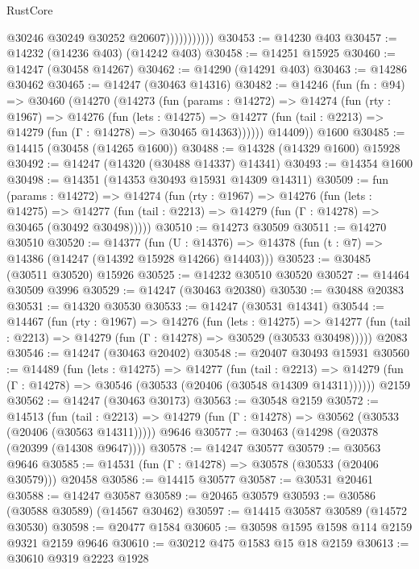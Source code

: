 \begin{lexlean}{RustCore}
\begin{coremodule}
                          @30246
                          @30249
                          @30252
                          @20607)))))))))))
@30453 := @14230 @403
@30457 := @14232 (@14236 @403) (@14242 @403)
@30458 := @14251 @15925
@30460 := @14247 (@30458 @14267)
@30462 := @14290 (@14291 @403)
@30463 := @14286 @30462
@30465 := @14247 (@30463 @14316)
@30482 := @14246
    (fun (fn : @94) =>
    @30460
      (@14270
        (@14273
          (fun (params : @14272) =>
          @14274
            (fun (rty : @1967) =>
            @14276
              (fun (lets : @14275) =>
              @14277 (fun (tail : @2213) => @14279 (fun (Γ : @14278) => @30465 @14363))))))
        @14409))
    @1600
@30485 := @14415 (@30458 (@14265 @1600))
@30488 := @14328 (@14329 @1600) @15928
@30492 := @14247 (@14320 (@30488 @14337) @14341)
@30493 := @14354 @1600
@30498 := @14351 (@14353 @30493 @15931 @14309 @14311)
@30509 := fun (params : @14272) =>
  @14274
    (fun (rty : @1967) =>
    @14276
      (fun (lets : @14275) =>
      @14277 (fun (tail : @2213) => @14279 (fun (Γ : @14278) => @30465 (@30492 @30498)))))
@30510 := @14273 @30509
@30511 := @14270 @30510
@30520 := @14377
    (fun (U : @14376) => @14378 (fun (t : @7) => @14386 (@14247 (@14392 @15928 @14266) @14403)))
@30523 := @30485 (@30511 @30520) @15926
@30525 := @14232 @30510 @30520
@30527 := @14464 @30509 @3996
@30529 := @14247 (@30463 @20380)
@30530 := @30488 @20383
@30531 := @14320 @30530
@30533 := @14247 (@30531 @14341)
@30544 := @14467
    (fun (rty : @1967) =>
    @14276
      (fun (lets : @14275) =>
      @14277 (fun (tail : @2213) => @14279 (fun (Γ : @14278) => @30529 (@30533 @30498)))))
    @2083
@30546 := @14247 (@30463 @20402)
@30548 := @20407 @30493 @15931
@30560 := @14489
    (fun (lets : @14275) =>
    @14277
      (fun (tail : @2213) =>
      @14279 (fun (Γ : @14278) => @30546 (@30533 (@20406 (@30548 @14309 @14311))))))
    @2159
@30562 := @14247 (@30463 @30173)
@30563 := @30548 @2159
@30572 := @14513
    (fun (tail : @2213) => @14279 (fun (Γ : @14278) => @30562 (@30533 (@20406 (@30563 @14311)))))
    @9646
@30577 := @30463 (@14298 (@20378 (@20399 (@14308 @9647))))
@30578 := @14247 @30577
@30579 := @30563 @9646
@30585 := @14531 (fun (Γ : @14278) => @30578 (@30533 (@20406 @30579))) @20458
@30586 := @14415 @30577
@30587 := @30531 @20461
@30588 := @14247 @30587
@30589 := @20465 @30579
@30593 := @30586 (@30588 @30589) (@14567 @30462)
@30597 := @14415 @30587 @30589 (@14572 @30530)
@30598 := @20477 @1584
@30605 := @30598 @1595 @1598 @114 @2159 @9321 @2159 @9646
@30610 := @30212 @475 @1583 @15 @18 @2159
@30613 := @30610 @9319 @2223 @1928

\end{coremodule}
\end{lexlean}
